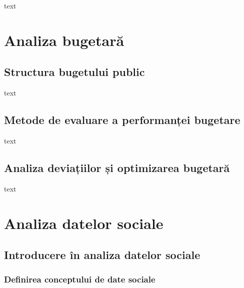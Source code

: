 \documentclass[
  11pt,
  b5paper,
  nottoc]{book}
\begin{document}
text


\hypertarget{cap5}{%
\chapter{Analiza bugetară}\label{cap5}}

\hypertarget{structura-bugetului-public}{%
\section{Structura bugetului public}\label{structura-bugetului-public}}

text

\hypertarget{metode-de-evaluare-a-performanux21bei-bugetare}{%
\section{Metode de evaluare a performanței
bugetare}\label{metode-de-evaluare-a-performanux21bei-bugetare}}

text

\hypertarget{analiza-deviaux21biilor-ux219i-optimizarea-bugetarux103}{%
\section{Analiza deviațiilor și optimizarea
bugetară}\label{analiza-deviaux21biilor-ux219i-optimizarea-bugetarux103}}

text


\hypertarget{cap6}{%
\chapter{Analiza datelor sociale}\label{cap6}}

\hypertarget{introducere-uxeen-analiza-datelor-sociale}{%
\section{Introducere în analiza datelor
sociale}\label{introducere-uxeen-analiza-datelor-sociale}}

\hypertarget{definirea-conceptului-de-date-sociale}{%
\subsection{Definirea conceptului de date
sociale}\label{definirea-conceptului-de-date-sociale}}
\end{document}
